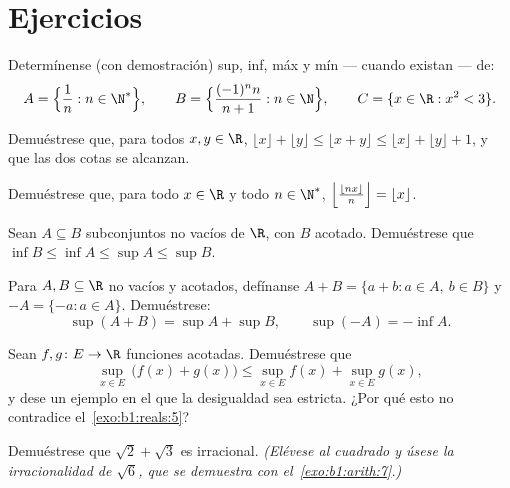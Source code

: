 \section{Ejercicios}

\begin{exercise}[$\star$]\label{exo:b1:reals:1}
Determínense (con demostración) sup, inf, máx y mín --- cuando existan --- de:
\[
A = \Bigl\{\frac{1}{n} : n \in \N^*\Bigr\},
\qquad
B = \Bigl\{\frac{(-1)^n n}{n+1} : n \in \N\Bigr\},
\qquad
C = \{x \in \R : x^2 < 3\}.
\]
\end{exercise}

\begin{exercise}[$\star$]\label{exo:b1:reals:2}
Demuéstrese que, para todos $x, y \in \R$, $\lfloor x \rfloor +
\lfloor y \rfloor \leq \lfloor x + y \rfloor \leq \lfloor x \rfloor +
\lfloor y \rfloor + 1$, y que las dos cotas se alcanzan.
\end{exercise}

\begin{exercise}[$\star$]\label{exo:b1:reals:3}
Demuéstrese que, para todo $x \in \R$ y todo $n \in \N^*$,
$\Bigl\lfloor \frac{\lfloor nx \rfloor}{n} \Bigr\rfloor = \lfloor x
\rfloor$.
\end{exercise}

\begin{exercise}[$\star$]\label{exo:b1:reals:4}
Sean $A \subseteq B$ subconjuntos no vacíos de $\R$, con $B$ acotado.
Demuéstrese que $\inf B \leq \inf A \leq \sup A \leq \sup B$.
\end{exercise}

\begin{exercise}[$\star\star$]\label{exo:b1:reals:5}
Para $A, B \subseteq \R$ no vacíos y acotados, defínanse $A + B = \{a + b : a
\in A,\ b \in B\}$ y $-A = \{-a : a \in A\}$. Demuéstrese:
\[
\sup(A + B) = \sup A + \sup B,
\qquad
\sup(-A) = -\inf A .
\]
\end{exercise}

\begin{exercise}[$\star\star$]\label{exo:b1:reals:6}
Sean $f, g \colon E \to \R$ funciones acotadas. Demuéstrese que
\[
\sup_{x \in E}\, \bigl(f(x) + g(x)\bigr) \leq \sup_{x \in E} f(x) +
\sup_{x \in E} g(x),
\]
y dese un ejemplo en el que la desigualdad sea estricta. ¿Por qué esto
no contradice el~\cref{exo:b1:reals:5}?
\end{exercise}

\begin{exercise}[$\star\star$]\label{exo:b1:reals:7}
Demuéstrese que $\sqrt 2 + \sqrt 3$ es irracional. \emph{(Elévese al
cuadrado y úsese la irracionalidad de $\sqrt 6$, que se demuestra con
el~\cref{exo:b1:arith:7}.)}
\end{exercise}

